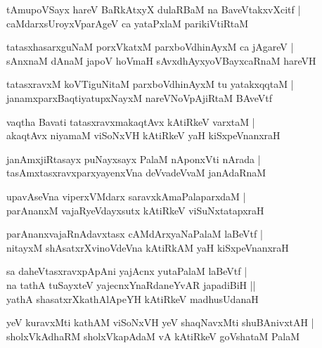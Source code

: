 \documentclass[twoside,12pt,openright]{book}
\newcounter{shloka}[chapter]
\begin{document}
\begin{shloka}%
tAmupoVSayx hareV BaRkAtxyX dulaRBaM na BaveVtakxvXcitf |\\
caMdarxsUroyxVparAgeV ca yataPxlaM parikiVtiRtaM 
\end{shloka}

\begin{shloka}%
tatasxhasarxguNaM porxVkatxM parxboVdhinAyxM ca jAgareV |\\
sAnxnaM dAnaM japoV hoVmaH sAvxdhAyxyoVBayxcaRnaM hareVH
\end{shloka}

\begin{shloka}%
tatasxravxM koVTiguNitaM parxboVdhinAyxM tu yatakxqqtaM |\\
janamxparxBaqtiyatupxNayxM nareVNoVpAjiRtaM BAveVtf 
\end{shloka}

\begin{shloka}%
vaqtha Bavati tatasxravxmakaqtAvx kAtiRkeV varxtaM |\\
akaqtAvx niyamaM viSoNxVH kAtiRkeV yaH kiSxpeVnanxraH 
\end{shloka}

\begin{shloka}%
janAmxjiRtasayx puNayxsayx PalaM nAponxVti nArada |\\
tasAmxtasxravxparxyayenxVna deVvadeVvaM janAdaRnaM 
\end{shloka}

\begin{shloka}%
upavAseVna viperxVMdarx saravxkAmaPalaparxdaM |\\
parAnanxM vajaRyeVdayxsutx kAtiRkeV viSuNxtatapxraH
\end{shloka}

\begin{shloka}%
parAnanxvajaRnAdavxtasx cAMdArxyaNaPalaM laBeVtf |\\
nitayxM shAsatxrXvinoVdeVna kAtiRkAM yaH kiSxpeVnanxraH 
\end{shloka}

\begin{shloka}%
sa daheVtasxravxpApAni yajAcnx yutaPalaM laBeVtf |\\
na tathA tuSayxteV yajecnxYnaRdaneYvAR japadiBiH ||\\
yathA shasatxrXkathAlApeYH kAtiRkeV madhusUdanaH
\end{shloka}

\begin{shloka}%
yeV kuravxMti kathAM viSoNxVH yeV shaqNavxMti shuBAnivxtAH |\\
sholxVkAdhaRM sholxVkapAdaM  vA kAtiRkeV goVshataM PalaM 
\end{shloka}
\end{document}
